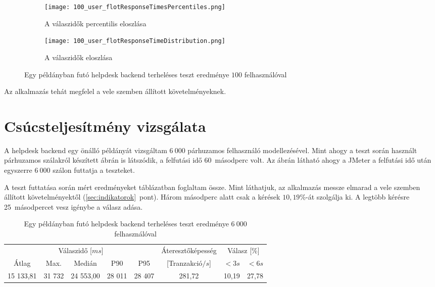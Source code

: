 \begin{figure}[hbt]
	\begin{subfigure}{.9\textwidth}
		\centering
		\texttt{[image: 100\_user\_flotResponseTimesPercentiles.png]}  
		\caption{A válaszidők percentilis eloszlása}
	\end{subfigure}
	\begin{subfigure}{.9\textwidth}
		\centering
		\texttt{[image: 100\_user\_flotResponseTimeDistribution.png]}  
		\caption{A válaszidők eloszlása}
	\end{subfigure}
	
	\caption[Helpdesk backend terheléses teszt 100 felhasználóval]{Egy példányban futó helpdesk backend terheléses teszt eredménye $100$ felhasználóval}
	\label{fig:1_instance_100_user}
\end{figure}

Az alkalmazás tehát megfelel a vele szemben állított követelményeknek.



\section{Csúcsteljesítmény vizsgálata}\label{sec:peak_1_instance}
A helpdesk backend egy önálló példányát vizsgáltam $6~000$ párhuzamos felhasználó modellezésével. Mint ahogy a teszt során használt párhuzamos szálakról készített  ábrán is látszódik, a felfutási idő $60$~másodperc volt. Az ábrán látható ahogy a JMeter a felfutási idő után egyszerre $6~000$ szálon futtatja a teszteket.

A teszt futtatása során mért eredményeket  táblázatban foglaltam össze. Mint láthatjuk, az alkalmazás messze elmarad a vele szemben állított követelményektől (\ref{sec:indikatorok}~pont). Három másodperc alatt csak a kérések $10,19\%$-át szolgálja ki. A legtöbb kérésre 25~másodpercet vesz igénybe a válasz adása.

\begin{table}[hbt]

		\begin{tabular}{ccccc|c|cc}
			\multicolumn{5}{c|}{Válaszidő [$ms$]}  & Áteresztőképesség & \multicolumn{2}{c}{Válasz [\%]}	\\
			Átlag & Max. & Medián & P90 & P95 &	[Tranzakció$/s$] & $<3s$& $<6s$ \\
			\hline 
			15 133,81 & 31 732 & 24 553,00 & 28 011 & 28 407  & 281,72 &	10,19 & 27,78 \\
		\end{tabular} 

	\caption{Egy példányban futó helpdesk backend terheléses teszt eredménye $6~000$ felhasználóval}
	\label{tabl:1_instance_10_hikkari_nginx}
\end{table}

